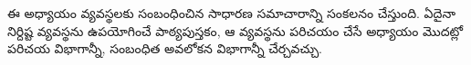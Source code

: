 \documentclass[../../../include/open-logic-chapter]{subfiles}
\begin{document}
      {}
      {}

\begin{editorial}
ఈ అధ్యాయం  వ్యవస్థలకు సంబంధించిన సాధారణ సమాచారాన్ని
సంకలనం చేస్తుంది. ఏదైనా నిర్దిష్ట వ్యవస్థను ఉపయోగించే పాఠ్యపుస్తకం,
ఆ వ్యవస్థను పరిచయం చేసే అధ్యాయం మొదట్లో పరిచయ విభాగాన్నీ, సంబంధిత
అవలోకన విభాగాన్నీ చేర్చవచ్చు.
\end{editorial}






\OLEndChapterHook
\end{document}

